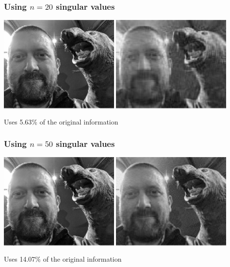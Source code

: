 \documentclass[aspectratio=169]{beamer}\usepackage[]{graphicx}\usepackage[]{xcolor}
\begin{document}
\begin{frame}\frametitle{Using $n=20$ singular values}
\begin{center}
\includegraphics[width=0.45\textwidth]{FIGS/L08-plot-image-svd-original-1.png}
\includegraphics[width=0.45\textwidth]{FIGS/L08-plot-image-svd-n20-1.png}
\end{center}
\vfill
Uses 5.63\% of the original information
\end{frame}





\begin{frame}\frametitle{Using $n=50$ singular values}
\begin{center}
\includegraphics[width=0.45\textwidth]{FIGS/L08-plot-image-svd-original-1.png}
\includegraphics[width=0.45\textwidth]{FIGS/L08-plot-image-svd-n50-1.png}
\end{center}
\vfill
Uses 14.07\% of the original information
\end{frame}






\end{document}
